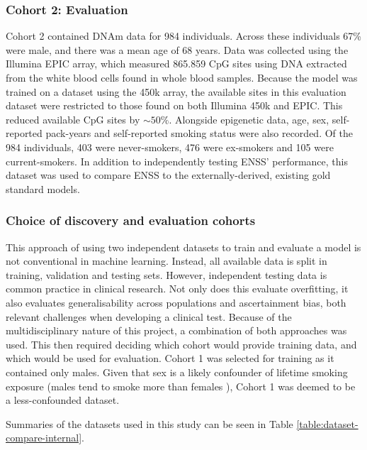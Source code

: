 \documentclass{article} %
\begin{document}
\subsubsection{Cohort 2: Evaluation}
Cohort 2 contained DNAm data for 984 individuals. Across these individuals 67\% were male, and there was a mean age of 68 years. Data was collected using the Illumina EPIC array, which measured \num{865,859} CpG sites using DNA extracted from the white blood cells found in whole blood samples. Because the model was trained on a dataset using the 450k array, the available sites in this evaluation dataset were restricted to those found on both Illumina 450k and EPIC. This reduced available CpG sites by \(\sim\!50\%\). Alongside epigenetic data, age, sex, self-reported pack-years and self-reported smoking status were also recorded. Of the 984 individuals, 403 were never-smokers, 476 were ex-smokers and 105 were current-smokers. In addition to independently testing ENSS' performance, this dataset was used to compare ENSS to the externally-derived, existing gold standard models.

\subsubsection{Choice of discovery and evaluation cohorts}
This approach of using two independent datasets to train and evaluate a model is not conventional in machine learning. Instead, all available data is split in training, validation and testing sets. However, independent testing data is common practice in clinical research. Not only does this evaluate overfitting, it also evaluates generalisability across populations and ascertainment bias, both relevant challenges when developing a clinical test. Because of the multidisciplinary nature of this project, a combination of both approaches was used. This then required deciding which cohort would provide training data, and which would be used for evaluation. Cohort 1 was selected for training as it contained only males. Given that sex is a likely confounder of lifetime smoking exposure (males tend to smoke more than females \cite{WHO2021Tobacco, higgins2015literature}), Cohort 1 was deemed to be a less-confounded dataset.

Summaries of the datasets used in this study can be seen in Table \ref{table:dataset-compare-internal}.

\end{document}
